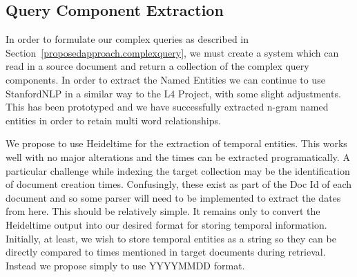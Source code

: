 \documentclass{mprop}
\begin{document}

\subsection{Query Component Extraction}
In order to formulate our complex queries as described in Section~\ref{proposedapproach.complexquery}, we must create a system which can read in a source document and return a collection of the complex query components. 
In order to extract the Named Entities we can continue to use StanfordNLP in a similar way to the L4 Project, with some slight adjustments.
This has been prototyped and we have successfully extracted n-gram named entities in order to retain multi word relationships.

We propose to use Heideltime for the extraction of temporal entities.
This works well with no major alterations and the times can be extracted programatically.
A particular challenge while indexing the target collection may be the identification of document creation times.
Confusingly, these exist as part of the Doc Id of each document and so some parser will need to be implemented to extract the dates from here.
This should be relatively simple.
It remains only to convert the Heideltime output into our desired format for storing temporal information.
Initially, at least, we wish to store temporal entities as a string so they can be directly compared to times mentioned in target documents during retrieval.
Instead we propose simply to use YYYYMMDD format.
\end{document}
